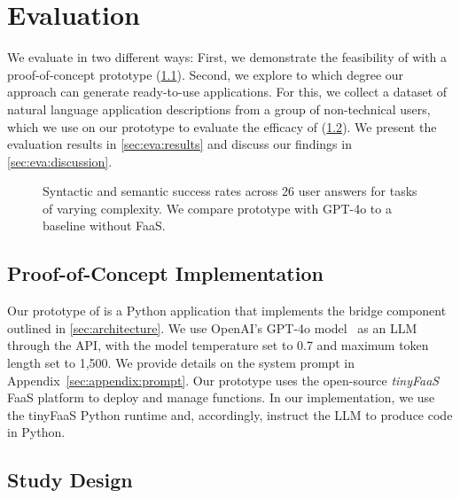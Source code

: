 \section{Evaluation}
\label{sec:eva}

We evaluate \sysname{} in two different ways:
First, we demonstrate the feasibility of \sysname{} with a proof-of-concept prototype (\cref{sec:eva:poc}).
Second, we explore to which degree our approach can generate ready-to-use applications.
For this, we collect a dataset of natural language application descriptions from a group of non-technical users, which we use on our prototype to evaluate the efficacy of \sysname{} (\cref{sec:eva:study-design}).
We present the evaluation results in \cref{sec:eva:results} and discuss our findings in \cref{sec:eva:discussion}.

\begin{figure*}
    \centering
    \hfill
    
    \caption{
        Syntactic and semantic success rates across 26 user answers for tasks of varying complexity. We compare \sysname{} prototype with GPT-4o to a baseline without FaaS.
    }
    \label{fig:eva-llm4faas-baseline}
\end{figure*}


\subsection{Proof-of-Concept Implementation}
\label{sec:eva:poc}

Our prototype of \sysname{} is a Python application that implements the bridge component outlined in \cref{sec:architecture}.
We use OpenAI's GPT-4o model~\cite{openai2024} as an LLM through the API, with the model temperature set to 0.7 and maximum token length set to 1,500.
We provide details on the system prompt in Appendix~\ref{sec:appendix:prompt}.
Our prototype uses the open-source \emph{tinyFaaS}~\cite{paper_pfandzelter2020_tinyfaas} FaaS platform to deploy and manage functions.
In our implementation, we use the tinyFaaS Python runtime and, accordingly, instruct the LLM to produce code in Python.


\subsection{Study Design}
\label{sec:eva:study-design}

